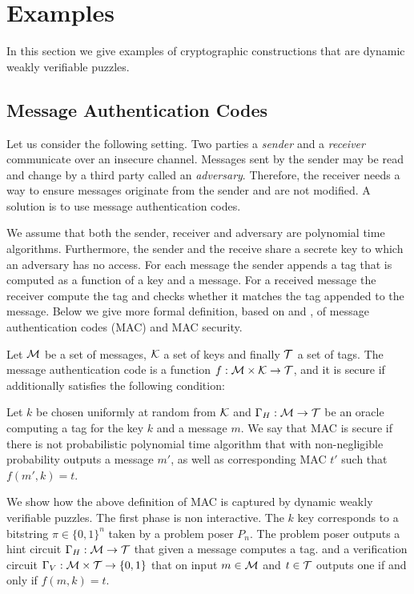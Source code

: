 \documentclass[11pt,a4paper,titlepage]{memoir}
\begin{document}
\section{Examples}
\label{section:wvp_examples}
In this section we give examples of cryptographic constructions that are dynamic weakly verifiable puzzles.

\subsection{Message Authentication Codes}
Let us consider the following setting. Two parties a \textit{sender} and a \textit{receiver} communicate over an insecure channel.
Messages sent by the sender may be read and change by a third party called an \textit{adversary}.
Therefore, the receiver needs a way to ensure messages originate from the sender and are not modified.
A solution is to use message authentication codes.

We assume that both the sender, receiver and adversary are polynomial time algorithms.
Furthermore, the sender and the receive share a secrete key to which an adversary has no access.
For each message the sender appends a tag that is computed as a function of a key and a message.
For a received message the receiver compute the tag and checks whether it matches the tag appended to the message.
Below we give more formal definition,  based on \cite{LectureNotesCrypo} and \cite{Goldreich:2004:FCV:975541},
of message authentication codes (MAC) and MAC security.
\begin{definition}
  Let $\mathcal{M}$ be a set of messages, $\mathcal{K}$ a set of keys and finally $\mathcal{T}$ a set of tags.
  The message authentication code is a function $f:\mathcal{M} \times \mathcal{K} \rightarrow \mathcal{T}$, and it is secure if additionally satisfies the following condition:

  Let $k$ be chosen uniformly at random from $\mathcal{K}$ and $\Gamma_H: \mathcal{M} \rightarrow \mathcal{T}$ be an oracle computing
  a tag for the key $k$ and a message $m$. We say that MAC is secure if there is not probabilistic polynomial time algorithm
  that with non-negligible probability outputs a message $m'$, as well as corresponding MAC $t'$ such that $f(m', k) = t$.
\end{definition}

We show how the above definition of MAC is captured by dynamic weakly verifiable puzzles.
The first phase is non interactive.
The $k$ key corresponds to a bitstring $\pi \in \{0,1\}^{n}$ taken by a problem poser $P_n$.
The problem poser outputs a hint circuit $\Gamma_H: \mathcal{M} \rightarrow \mathcal{T}$ that given a message computes a tag.
and a verification circuit $\Gamma_V: \mathcal{M} \times \mathcal{T} \rightarrow \{0,1\}$ that on input $m \in \mathcal{M}$ and $t \in \mathcal{T}$
outputs one if and only if $f(m, k) = t$.
\end{document}
